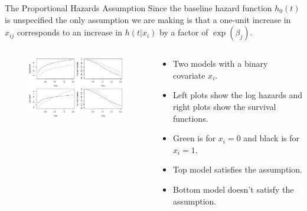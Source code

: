 \documentclass[
  ignorenonframetext,
  aspectratio=169,
]{beamer}
\begin{document}
\begin{frame}{The Proportional Hazards Assumption}
\protect\hypertarget{the-proportional-hazards-assumption-1}{}
Since the baseline hazard function \(h_0(t)\) is unspecified the only
assumption we are making is that a
\alert{one-unit increase in $x_{ij}$ corresponds to an increase in $h(t|x_i)$ by a factor of $\exp \left(\beta_{j}\right)$}.

\begin{columns}[T]
\begin{column}{0.7\textwidth}
\begin{figure}

{\centering \includegraphics[width=4.17708in,height=\textheight]{images/proportional_assumption.png}

}

\end{figure}
\end{column}

\begin{column}{0.3\textwidth}
\begin{itemize}
\item
  Two models with a binary covariate \(x_i\).
\item
  Left plots show the log hazards and right plots show the survival
  functions.
\item
  Green is for \(x_i = 0\) and black is for \(x_i = 1\).
\item
  Top model satisfies the assumption.
\item
  Bottom model doesn't satisfy the assumption.
\end{itemize}
\end{column}
\end{columns}
\end{frame}
\end{document}
